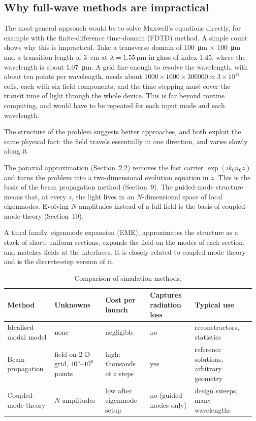 \documentclass[11pt,a4paper]{article}
\begin{document}
\subsection{Why full-wave methods are impractical}
The most general approach would be to solve Maxwell's equations directly, for example with the finite-difference time-domain (FDTD) method. A simple count shows why this is impractical. Take a transverse domain of \SI{100}{\micro\meter} $\times$ \SI{100}{\micro\meter} and a transition length of \SI{3}{\centi\meter} at $\lambda = \SI{1.55}{\micro\meter}$ in glass of index 1.45, where the wavelength is about \SI{1.07}{\micro\meter}. A grid fine enough to resolve the wavelength, with about ten points per wavelength, needs about $1000 \times 1000 \times 300000 \approx 3\times 10^{11}$ cells, each with six field components, and the time stepping must cover the transit time of light through the whole device. This is far beyond routine computing, and would have to be repeated for each input mode and each wavelength.

The structure of the problem suggests better approaches, and both exploit the same physical fact: the field travels essentially in one direction, and varies slowly along it.

The paraxial approximation (Section~2.2) removes the fast carrier $\exp(ik_0 n_0 z)$ and turns the problem into a two-dimensional evolution equation in $z$. This is the basis of the beam propagation method (Section~9). The guided-mode structure means that, at every $z$, the light lives in an $N$-dimensional space of local eigenmodes. Evolving $N$ amplitudes instead of a full field is the basis of coupled-mode theory (Section~10).

A third family, eigenmode expansion (EME), approximates the structure as a stack of short, uniform sections, expands the field on the modes of each section, and matches fields at the interfaces. It is closely related to coupled-mode theory and is the discrete-step version of it.

\begin{table}[h]
\centering
\caption{Comparison of simulation methods.}
\label{tab:methods}
\small
\begin{tabular}{@{}lllll@{}}
\toprule
Method & Unknowns & Cost per launch & Captures radiation loss & Typical use \\
\midrule
Idealised modal model & none & negligible & no & reconstructors, statistics \\
Beam propagation & field on 2-D grid, $10^5$--$10^6$ points & high: thousands of $z$ steps & yes & reference solutions, arbitrary geometry \\
Coupled-mode theory & $N$ amplitudes & low after eigenmode setup & no (guided modes only) & design sweeps, many wavelengths \\
\bottomrule
\end{tabular}
\end{table}
\end{document}
